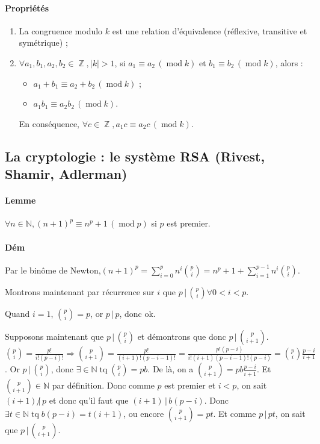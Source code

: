 \documentclass{article}
\DeclareMathOperator{\tq}{\text{ tq }}
\DeclareMathOperator{\Z}{\mathbb Z}
\DeclareMathOperator{\modulo}{mod}
\newcommand{\cmod}[1]{\, (\modulo #1)}
\begin{document}
			\paragraph{Propriétés}
				\begin{enumerate}
					\item La congruence modulo $k$ est une relation d'équivalence (réflexive, transitive et symétrique) ;
					\item $\forall a_1, b_1, a_2, b_2 \in \Z, |k| > 1$, si $a_1 \equiv a_2 \cmod k$ et $b_1 \equiv b_2 \cmod k$, alors :
						\begin{itemize}
							\item $a_1 + b_1 \equiv a_2 + b_2 \cmod k$ ;
							\item $a_1b_1 \equiv a_2b_2 \cmod k$.
						\end{itemize}
					En conséquence, $\forall c \in \Z, a_1c \equiv a_2c \cmod k$.
				\end{enumerate}

		\subsection{La cryptologie : le système RSA (Rivest, Shamir, Adlerman)}
		
			\paragraph{Lemme} $\forall n \in \mathbb N, (n+1)^p \equiv n^p + 1 \cmod p$ si $p$ est premier.
			
			\paragraph{Dém} Par le binôme de Newton,$(n+1)^p = \sum_{i=0}^p n^i\binom pi = n^p + 1 + \sum_{i=1}^{p-1}n^i\binom pi$.
			
			Montrons maintenant par récurrence sur $i$ que $p \, | \, \binom pi \forall 0 < i < p$.
			
			Quand $i = 1$, $\binom pi = p$, or $p \, | \, p$, donc ok.
			
			Supposons maintenant que $p \, | \, \binom pi$ et démontrons que donc $p \, | \, \binom p{i+1}$. $\binom p{i} = \frac {p!}{i!(p-i)!} \Rightarrow \binom p{i+1} = 
			\frac {p!}{(i+1)!(p-i-1)!} = \frac {p!(p-i)}{i!(i+1)(p-i-1)!(p-i)} = \binom pi \frac {p-i}{i+1}$. Or $p \, | \, \binom pi$, donc $\exists  \in \mathbb N \tq
			\binom pi = pb$. De là, on a $\binom p{i+1} = pb\frac {p-i}{i+1}$. Et $\binom p{i+1} \in \mathbb N$ par définition. Donc comme $p$ est premier et $i < p$,
			on sait $(i+1) \, \not | \, p$ et donc qu'il faut que $(i+1) \, | \, b(p-i)$. Donc $\exists t \in \mathbb N \tq b(p-i) = t(i+1)$, ou encore $\binom p{i+1} = pt$.
			Et comme $p \, | \, pt$, on sait que $p \, | \, \binom p{i+1}$.
			
\end{document}
